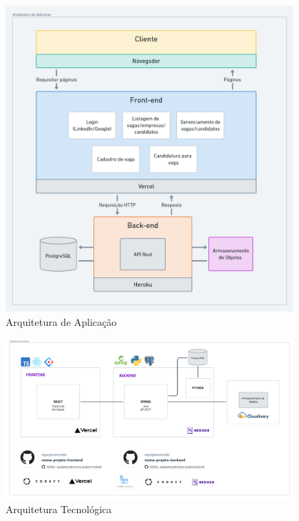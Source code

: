 \begin{figure}[H]
	\centering
	\caption{\label{fig-arq-app}Arquitetura de Aplicação}
	\includegraphics[width=0.95\textwidth]{imagens/arq-proj-arq-app2.png}
\end{figure}

\begin{figure}[H]
	\centering
	\caption{\label{fig-arq-tec}Arquitetura Tecnológica}
	\includegraphics[width=0.95\textwidth]{imagens/arq-proj-arq-tec.png}
\end{figure}

